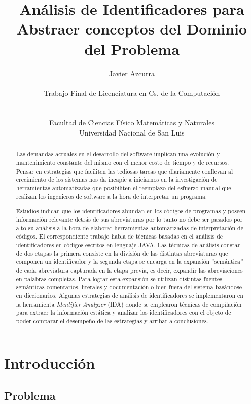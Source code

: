 \documentclass[12pt]{report}
\title{Análisis de Identificadores para Abstraer conceptos del Dominio del Problema}
\author{Javier Azcurra\\\\Trabajo Final de Licenciatura en Cs. de la Computación\\\\\\Facultad de Ciencias Físico Matemáticas y Naturales\\Universidad Nacional de San Luis}
\begin{document}
\maketitle



\begin{abstract}
Las demandas actuales en el desarrollo del software implican una evolución y mantenimiento constante del mismo con el menor costo de tiempo y de recursos. Pensar en estrategias que faciliten las tediosas tareas que diariamente conllevan al crecimiento de los sistemas nos da incapie a iniciarnos en la investigación de herramientas automatizadas que posibiliten el reemplazo del esfuerzo manual que realizan los ingenieros de software a la hora de interpretar un programa.

Estudios indican que los identificadores abundan en los códigos de programas y poseen información relevante detrás de sus abreviaturas por lo tanto no debe ser pasados por alto su análisis a la hora de elaborar herramientas automatizadas de interpretación de códigos.
El correspondiente trabajo habla de técnicas basadas en el análisis de identificadores en códigos escritos en lenguaje JAVA\texttrademark .
Las técnicas de análisis constan de dos etapas la primera consiste en la división de las distintas abreviaturas que componen un identificador y la segunda etapa se encarga en la expansión ``semántica'' de cada abreviatura capturada en la etapa previa, es decir, expandir las abreviaciones en palabras completas. Para lograr esta expansión se utilizan distintas fuentes semánticas comentarios, literales y documentación o bien fuera del sistema basándose en diccionarios. Algunas estrategias de análisis de identificadores se implementaron en la herramienta \textit{Identifier Analyzer} (IDA) donde se emplearon técnicas de compilación para extraer la información estática y analizar los identificadores con el objeto de poder comparar el desempeño de las estrategias y arribar a conclusiones.


\end{abstract}

\chapter{Introducción}
\section{Problema}
\end{document}
